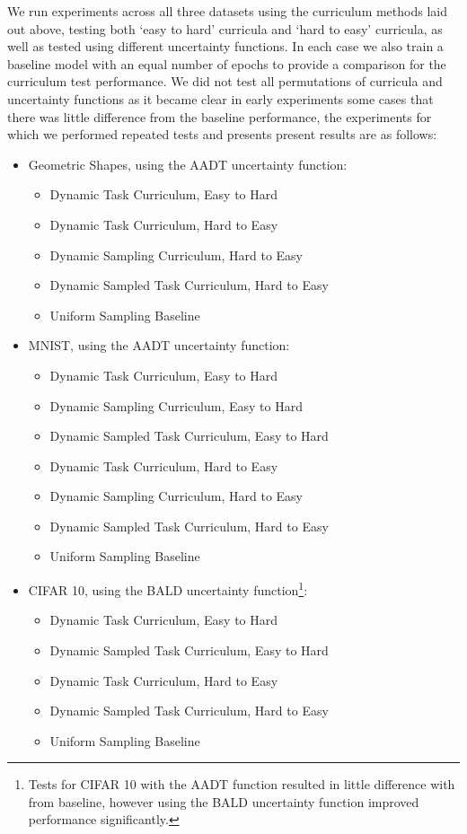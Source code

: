 We run experiments across all three datasets using the curriculum methods laid out above, testing both `easy to hard' curricula and `hard to easy' curricula, as well as tested using different uncertainty functions. In each case we also train a baseline model with an equal number of epochs to provide a comparison for the curriculum test performance. We did not test all permutations of curricula and uncertainty functions as it became clear in early experiments some cases that there was little difference from the baseline performance, the experiments for which we performed repeated tests and presents present results are as follows:
\begin{itemize}
\item Geometric Shapes, using the AADT uncertainty function:
\begin{itemize}
\item{Dynamic Task Curriculum, Easy to Hard}
\item{Dynamic Task Curriculum, Hard to Easy}
\item{Dynamic Sampling Curriculum, Hard to Easy}
\item{Dynamic Sampled Task Curriculum, Hard to Easy}
\item{Uniform Sampling Baseline}
\end{itemize}
\item MNIST, using the AADT uncertainty function:
\begin{itemize}
\item{Dynamic Task Curriculum, Easy to Hard}
\item{Dynamic Sampling Curriculum, Easy to Hard}
\item{Dynamic Sampled Task Curriculum, Easy to Hard}
\item{Dynamic Task Curriculum, Hard to Easy}
\item{Dynamic Sampling Curriculum, Hard to Easy}
\item{Dynamic Sampled Task Curriculum, Hard to Easy}
\item{Uniform Sampling Baseline}
\end{itemize}
\item CIFAR 10, using the BALD uncertainty function\footnote {Tests for CIFAR 10 with the AADT function resulted in little difference with from baseline, however using the BALD uncertainty function improved performance significantly.}:
\begin{itemize}
\item{Dynamic Task Curriculum, Easy to Hard}
\item{Dynamic Sampled Task Curriculum, Easy to Hard}
\item{Dynamic Task Curriculum, Hard to Easy}
\item{Dynamic Sampled Task Curriculum, Hard to Easy}
\item{Uniform Sampling Baseline}
\end{itemize}
\end{itemize}

